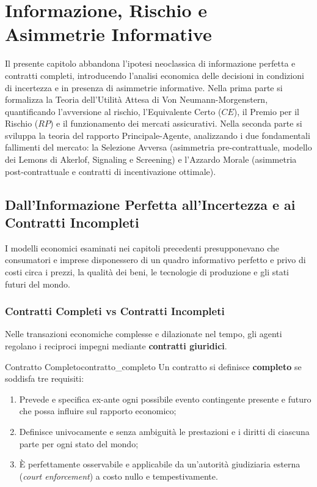 \chapter{Informazione, Rischio e Asimmetrie Informative}
\label{chap:informazione_rischio}

\begin{tcolorbox}[colback=navyblue!5!white, colframe=navyblue, title=\textbf{Quadro Concettuale del Capitolo}]
Il presente capitolo abbandona l'ipotesi neoclassica di informazione perfetta e contratti completi, introducendo l'analisi economica delle decisioni in condizioni di incertezza e in presenza di asimmetrie informative. Nella prima parte si formalizza la Teoria dell'Utilità Attesa di Von Neumann-Morgenstern, quantificando l'avversione al rischio, l'Equivalente Certo ($CE$), il Premio per il Rischio ($RP$) e il funzionamento dei mercati assicurativi. Nella seconda parte si sviluppa la teoria del rapporto Principale-Agente, analizzando i due fondamentali fallimenti del mercato: la Selezione Avversa (asimmetria pre-contrattuale, modello dei Lemons di Akerlof, Signaling e Screening) e l'Azzardo Morale (asimmetria post-contrattuale e contratti di incentivazione ottimale).
\end{tcolorbox}

\section{Dall'Informazione Perfetta all'Incertezza e ai Contratti Incompleti}

I modelli economici esaminati nei capitoli precedenti presupponevano che consumatori e imprese disponessero di un quadro informativo perfetto e privo di costi circa i prezzi, la qualità dei beni, le tecnologie di produzione e gli stati futuri del mondo.

\subsection{Contratti Completi vs Contratti Incompleti}
Nelle transazioni economiche complesse e dilazionate nel tempo, gli agenti regolano i reciproci impegni mediante \textbf{contratti giuridici}.
\begin{definizione}{Contratto Completo}{contratto_completo}
Un contratto si definisce \textbf{completo} se soddisfa tre requisiti:
\begin{enumerate}
    \item Prevede e specifica ex-ante ogni possibile evento contingente presente e futuro che possa influire sul rapporto economico;
    \item Definisce univocamente e senza ambiguità le prestazioni e i diritti di ciascuna parte per ogni stato del mondo;
    \item È perfettamente osservabile e applicabile da un'autorità giudiziaria esterna (\textit{court enforcement}) a costo nullo e tempestivamente.
\end{enumerate}
\end{definizione}

